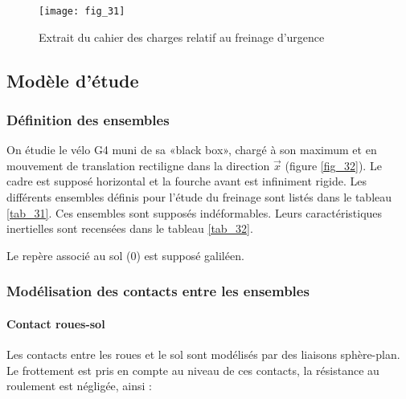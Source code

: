 \begin{figure}[!h]
\centering
\texttt{[image: fig\_31]}
\caption{\label{fig_3_cargo}Extrait du cahier des charges relatif au freinage d'urgence}
\end{figure}





\subsection{Modèle d'étude}
\subsubsection{Définition des ensembles}
On étudie le vélo G4 muni de sa «black box», chargé à son maximum et en mouvement de translation rectiligne dans la direction \(\vec{x}\) (figure \ref{fig_32}). Le cadre est supposé horizontal et la fourche avant est infiniment rigide. Les différents ensembles définis pour l'étude du freinage sont listés dans le tableau \ref{tab_31}. Ces ensembles sont supposés indéformables. Leurs caractéristiques inertielles sont recensées dans le tableau \ref{tab_32}.

Le repère associé au sol (0) est supposé galiléen.

\subsubsection{Modélisation des contacts entre les ensembles}
\paragraph*{Contact roues-sol} 
Les contacts entre les roues et le sol sont modélisés par des liaisons sphère-plan. Le frottement est pris en compte au niveau de ces contacts, la résistance au roulement est négligée, ainsi :

